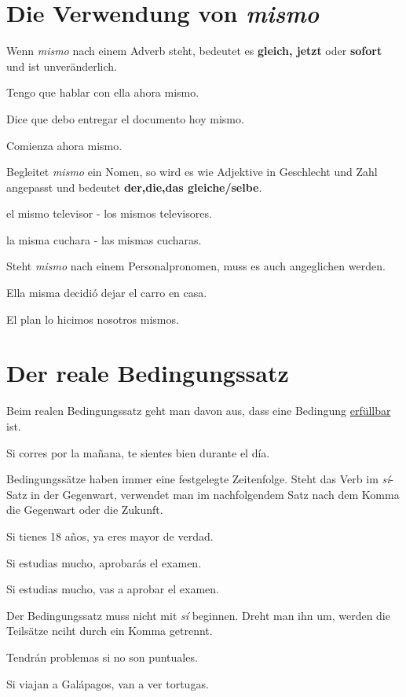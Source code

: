 \section{Die Verwendung von \textit{mismo}}
Wenn \textit{mismo} nach einem Adverb steht, bedeutet es
\textbf{gleich, jetzt} oder \textbf{sofort} und ist unveränderlich.
\begin{ejemplos}
    \item Tengo que hablar con ella ahora mismo.
    \item Dice que debo entregar el documento hoy mismo.
    \item Comienza ahora mismo.
\end{ejemplos}
Begleitet \textit{mismo} ein Nomen, so wird es wie Adjektive
in Geschlecht und Zahl angepasst und bedeutet 
\textbf{der,die,das gleiche/selbe}.
\begin{ejemplos}
    \item el mismo televisor - los mismos televisores.
    \item la misma cuchara - las mismas cucharas.
\end{ejemplos} 
Steht \textit{mismo} nach einem Personalpronomen, muss es
auch angeglichen werden.
\begin{ejemplos}
    \item Ella misma decidi\'o dejar el carro en casa.
    \item El plan lo hicimos nosotros mismos.
\end{ejemplos}
\section{Der reale Bedingungssatz}
Beim realen Bedingungssatz geht man davon aus, dass eine
Bedingung \underline{erfüllbar} ist.
\begin{ejemplos}
    \item Si corres por la ma\~nana, te sientes bien durante el d\'ia.
\end{ejemplos}
Bedingungssätze haben immer eine festgelegte Zeitenfolge.
Steht das Verb im \textit{s\'i}-Satz in der Gegenwart,
verwendet man im nachfolgendem Satz nach dem Komma die 
Gegenwart oder die Zukunft.
\begin{ejemplos}
    \item Si tienes 18 a\~nos, ya eres mayor de verdad.
    \item Si estudias mucho, aprobar\'as el examen.
    \item Si estudias mucho, vas a aprobar el examen.
\end{ejemplos}
Der Bedingungssatz muss nicht mit \textit{s\'i} beginnen.
Dreht man ihn um, werden die Teilsätze nciht durch ein 
Komma getrennt.
\begin{ejemplos}
    \item Tendr\'an problemas si no son puntuales.
    \item Si viajan a Gal\'apagos, van a ver tortugas.
\end{ejemplos}
